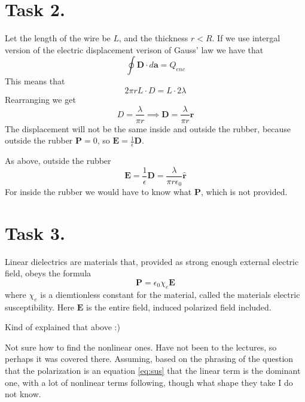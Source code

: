 \documentclass[a4paper,11pt]{article}
\begin{document}
\section*{Task 2.}
\begin{alphalist}
    \item Let the length of the wire be $L$, and the thickness $r < R$. If we use intergal version of the electric displacement 
        verison of Gauss' law we have that
        \[
            \oint \mathbf{D} \cdot d\mathbf{a} = Q_{enc}
        \]
        This means that
        \[
            2\pi r L \cdot D = L \cdot 2\lambda
        \]
        Rearranging we get
        \[
            D = \frac{\lambda}{\pi r} \implies \mathbf{D} = \frac{\lambda}{\pi r}\mathbf{\hat{r}}
        \]
        The displacement will not be the same inside and outside the rubber, because outside the rubber $\mathbf{P} = 0$, so 
        $\mathbf{E} = \frac{1}{\epsilon}\mathbf{D}$.
    \item As above, outside the rubber
        \[
            \mathbf{E} = \frac{1}{\epsilon}\mathbf{D} = \frac{\lambda}{\pi r \epsilon_0}\mathbf{\hat{r}}
        \]
        For inside the rubber we would have to know what $\mathbf{P}$, which is not provided.

\end{alphalist}

\section*{Task 3.}
\begin{alphalist}
    \item Linear dielectrics are materials that, provided as strong enough external electric field, obeys the formula
        \begin{equation}
            \mathbf{P} = \epsilon_0 \chi_e \mathbf{E}
            \label{eq:sus}
        \end{equation}
        where $\chi_e$ is a diemtionless constant for the material, called the materials electric susceptibility. Here $\mathbf{E}$ is the entire field, induced
        polarized field included.
    \item Kind of explained that above :)
    \item Not sure how to find the nonlinear ones. Have not been to the lectures, so perhaps it was covered there. Assuming, based on the phrasing of the 
        question that the polarization is an equation \ref{eq:sus} that the linear term is the dominant one, with a lot of nonlinear terms following, though what
        shape they take I do not know.
\end{alphalist}
\end{document}
